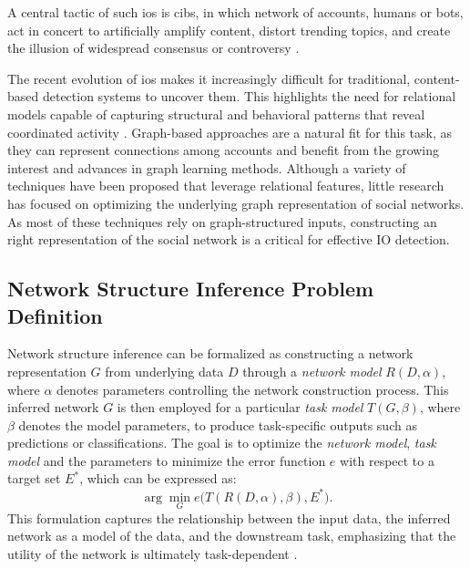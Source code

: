 \documentclass{article}
\begin{document}
A central tactic of such \acp{io} is \acp{cib}, in which network of accounts, humans or bots, act in concert to artificially amplify content, distort trending topics, and create the illusion of widespread consensus or controversy \cite{mannocci2024detection}. 

The recent evolution of \acp{io} makes it increasingly difficult for traditional, content-based detection systems to uncover them. This highlights the need for relational models capable of capturing structural and behavioral patterns that reveal coordinated activity \cite{minici2025iohunter}. Graph-based approaches are a natural fit for this task, as they can represent connections among accounts and benefit from the growing interest and advances in graph learning methods. Although a variety of techniques have been proposed that leverage relational features, little research has focused on optimizing the underlying graph representation of social networks. As most of these techniques rely on graph-structured inputs, constructing an right representation of the social network is a critical for effective IO detection.

\subsection{Network Structure Inference Problem Definition}
Network structure inference can be formalized as constructing a network representation \( G \) from underlying data \( D \) through a \textit{network model} \( R(D, \alpha) \), where \(\alpha\) denotes parameters controlling the network construction process. This inferred network \( G \) is then employed for a particular \textit{task model} \( T(G, \beta) \), where \(\beta\) denotes the model parameters, to produce task-specific outputs such as predictions or classifications. The goal is to optimize the \textit{network model}, \textit{task model} and the parameters to minimize the error function \(e\) with respect to a target set \( E^{*} \), which can be expressed as:
\[
\arg \min_{G} e\big(T(R(D, \alpha), \beta), E^{*}\big).
\]
This formulation captures the relationship between the input data, the inferred network as a model of the data, and the downstream task, emphasizing that the utility of the network is ultimately task-dependent \cite{brugere2018network}. 
\end{document}
